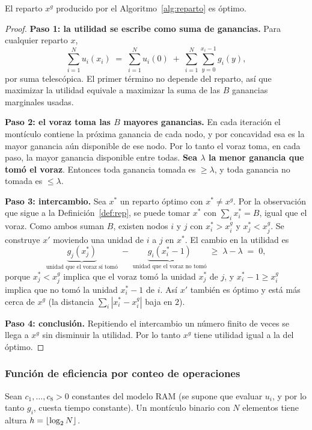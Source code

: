 \begin{teorema}\label{teo:optimo}
El reparto $x^g$ producido por el Algoritmo~\ref{alg:reparto} es óptimo.
\end{teorema}
\begin{proof}
\textbf{Paso 1: la utilidad se escribe como suma de ganancias.} Para cualquier reparto $x$,
\[
\sum_{i=1}^N u_i(x_i) \;=\; \sum_{i=1}^N u_i(0) \;+\; \sum_{i=1}^{N}\sum_{y=0}^{x_i-1} g_i(y),
\]
por suma telescópica. El primer término no depende del reparto, así que maximizar la utilidad equivale a maximizar la suma de las $B$ ganancias marginales usadas.

\textbf{Paso 2: el voraz toma las $B$ mayores ganancias.} En cada iteración el montículo contiene la próxima ganancia de cada nodo, y por concavidad esa es la mayor ganancia aún disponible de ese nodo. Por lo tanto el voraz toma, en cada paso, la mayor ganancia disponible entre todas. \textbf{Sea $\lambda$ la menor ganancia que tomó el voraz}. Entonces toda ganancia tomada es $\ge\lambda$, y toda ganancia no tomada es $\le\lambda$.

\textbf{Paso 3: intercambio.} Sea $x^*$ un reparto óptimo con $x^*\ne x^g$. Por la observación que sigue a la Definición~\ref{def:rep}, se puede tomar $x^*$ con $\sum_i x^*_i=B$, igual que el voraz. Como ambos suman $B$, existen nodos $i$ y $j$ con $x^*_i > x^g_i$ y $x^*_j < x^g_j$. Se construye $x'$ moviendo una unidad de $i$ a $j$ en $x^*$. El cambio en la utilidad es
\[
\underbrace{g_j(x^*_j)}_{\text{unidad que el voraz sí tomó}} \;-\; \underbrace{g_i(x^*_i-1)}_{\text{unidad que el voraz no tomó}} \;\ge\; \lambda - \lambda \;=\; 0,
\]
porque $x^*_j < x^g_j$ implica que el voraz tomó la unidad $x^*_j$ de $j$, y $x^*_i-1 \ge x^g_i$ implica que no tomó la unidad $x^*_i-1$ de $i$. Así $x'$ también es óptimo y está más cerca de $x^g$ (la distancia $\sum_i |x^*_i-x^g_i|$ baja en $2$).

\textbf{Paso 4: conclusión.} Repitiendo el intercambio un número finito de veces se llega a $x^g$ sin disminuir la utilidad. Por lo tanto $x^g$ tiene utilidad igual a la del óptimo.
\end{proof}

\subsubsection{Función de eficiencia por conteo de operaciones}

Sean $c_1,\dots,c_8>0$ constantes del modelo RAM (se supone que evaluar $u_i$, y por lo tanto $g_i$, cuesta tiempo constante). Un montículo binario con $N$ elementos tiene altura $h=\lfloor\log_2 N\rfloor$.

